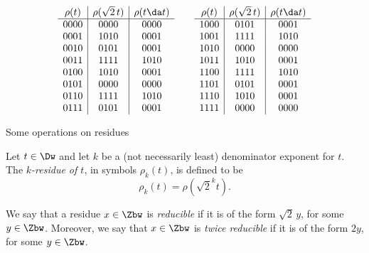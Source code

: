 \begin{table}
  \[ \begin{array}{c|c|c} \rho(t) & \rho(\sqrt{2}\,t) & \rho(t\da t)\\\hline
    0000 & 0000 & 0000 \\
    0001 & 1010 & 0001 \\
    0010 & 0101 & 0001 \\
    0011 & 1111 & 1010 \\

    0100 & 1010 & 0001 \\
    0101 & 0000 & 0000 \\
    0110 & 1111 & 1010 \\
    0111 & 0101 & 0001 \\
  \end{array}\qquad
  \begin{array}{c|c|c} \rho(t) & \rho(\sqrt{2}\,t) & \rho(t\da t)\\\hline
    1000 & 0101 & 0001 \\
    1001 & 1111 & 1010 \\
    1010 & 0000 & 0000 \\
    1011 & 1010 & 0001 \\

    1100 & 1111 & 1010 \\
    1101 & 0101 & 0001 \\
    1110 & 1010 & 0001 \\
    1111 & 0000 & 0000 \\
  \end{array}
  \]
  \caption{Some operations on residues}\label{tab-residue}
\end{table}

\begin{definition}[$k$-Residue]
  Let $t\in\Dw$ and let $k$ be a (not necessarily least) denominator exponent for $t$. The {\em
  $k$-residue of $t$}, in symbols $\rho_k(t)$, is defined to be
  \[
    \rho_k(t) = \rho(\sqrt{2}^k t).
  \]
\end{definition}

\begin{definition}[Reducibility]
  We say that a residue $x\in\Zbw$ is {\em reducible} if it is of the form $\sqrt{2}\,y$, for some
  $y\in\Zbw$. Moreover, we say that $x\in\Zbw$ is {\em twice reducible} if it is of the form $2y$,
  for some $y\in\Zbw$.
\end{definition}

